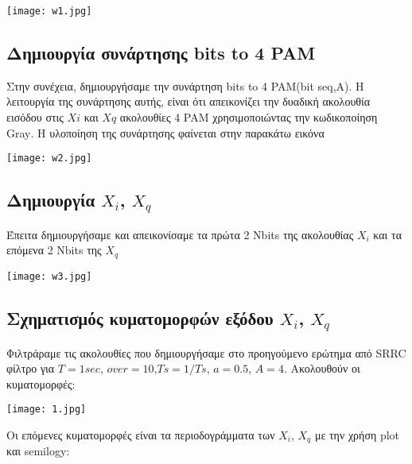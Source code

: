 \documentclass[11pt]{article}
\begin{document}
\begin{center}
	\texttt{[image: w1.jpg]}
\end{center}

\subsection{Δημιουργία συνάρτησης \foreignlanguage{english}{bits to 4 PAM}}
Στην συνέχεια, δημιουργήσαμε την συνάρτηση \foreignlanguage{english}{bits to 4 PAM(bit seq,A)}. Η λειτουργία της συνάρτησης αυτής, είναι ότι απεικονίζει την δυαδική ακολουθία εισόδου στις $Xi$ και $Xq$ ακολουθίες \foreignlanguage{english}{4 PAM} χρησιμοποιώντας την κωδικοποίηση \foreignlanguage{english}{Gray}. Η υλοποίηση της συνάρτησης φαίνεται στην παρακάτω εικόνα

\begin{center}
	\texttt{[image: w2.jpg]}
\end{center}

\subsection{Δημιουργία $X_i$, $X_q$}
Έπειτα δημιουργήσαμε και απεικονίσαμε τα πρώτα \foreignlanguage{english}{2 Nbits} της ακολουθίας $X_i$ και τα επόμενα \foreignlanguage{english}{2 Nbits} της $X_q$

\begin{center}
	\texttt{[image: w3.jpg]}
\end{center}

\subsection{Σχηματισμός κυματομορφών εξόδου $X_i$, $X_q$}
Φιλτράραμε τις ακολουθίες που δημιουργήσαμε στο προηγούμενο ερώτημα από \foreignlanguage{english}{SRRC} φίλτρο για $T=1sec$, $over=10$,$Ts = 1/Ts$, $a=0.5$, $A = 4$. Ακολουθούν οι κυματομορφές:

\begin{center}
	\texttt{[image: 1.jpg]}
\end{center}

Οι επόμενες κυματομορφές είναι τα περιοδογράμματα των $X_i$, $X_q$ με την χρήση \foreignlanguage{english}{plot} και \foreignlanguage{english}{semilogy}:
\end{document}
